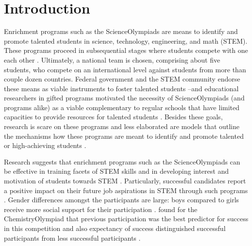 \documentclass[../main/TaylorFrancis/interactapasample]{subfiles}
\begin{document}
\section{Introduction}


Enrichment programs such as the ScienceOlympiads are means to identify and promote talented students in science, technology, engineering, and math (STEM). These programs proceed in subsequential stages where students compete with one each other \citep{Petersen.2017}. Ultimately, a national team is chosen, comprising about five students, who compete on an international level against students from more than couple dozen countries. Federal government and the STEM community endorse these means as viable instruments to foster talented students \citep{KMK.2009,Petersen.2017}--and educational researchers in gifted programs motivated the necessity of ScienceOlympiads (and programs alike) as a viable complementary to regular schools that have limited capacities to provide resources for talented students \citep{Reis.2010}. Besides these goals, research is scare on these programs and less elaborated are models that outline the mechanisms how these programs are meant to identify and promote talented or high-achieving students \citep{Ziegler.2004}.

Research suggests that enrichment programs such as the ScienceOlympiads can be effective in training facets of STEM skills and in developing interest and motivation of students towards STEM \citep{Oswald.2004,Aljughaiman.2012,Wai.2010,Marsh.1995}. Particularly, successful candidates report a positive impact on their future job aspirations in STEM through such programs \citep{Feng.2001,Oswald.2004,Subotnik.1993}. Gender differences amongst the participants are large: boys compared to girls receive more social support for their participation \citep[e.g.,][]{Lengfelder.2002,Urhahne.2012}. \cite{Urhahne.2012} found for the ChemistryOlympiad that previous participation was the best predictor for success in this competition and also expectancy of success distinguished successful participants from less successful participants \citep[similar findings in:][]{Stang.2014}.
\end{document}
